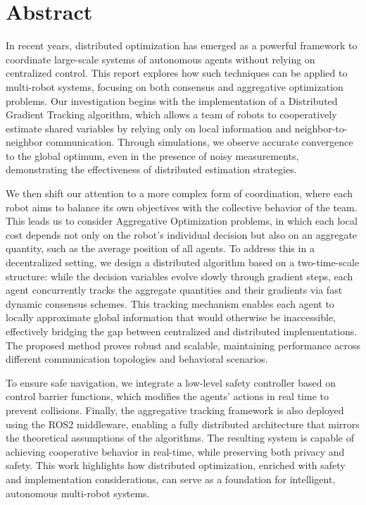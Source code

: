 \thispagestyle{empty}

\chapter*{Abstract}
In recent years, distributed optimization has emerged as a powerful framework to coordinate large-scale systems of autonomous agents without relying on centralized control. This report explores how such techniques can be applied to multi-robot systems, focusing on both consensus and aggregative optimization problems. Our investigation begins with the implementation of a Distributed Gradient Tracking algorithm, which allows a team of robots to cooperatively estimate shared variables by relying only on local information and neighbor-to-neighbor communication. Through simulations, we observe accurate convergence to the global optimum, even in the presence of noisy measurements, demonstrating the effectiveness of distributed estimation strategies. 

\bigskip

We then shift our attention to a more complex form of coordination, where each robot aims to balance its own objectives with the collective behavior of the team. This leads us to consider Aggregative Optimization problems, in which each local cost depends not only on the robot's individual decision but also on an aggregate quantity, such as the average position of all agents. To address this in a decentralized setting, we design a distributed algorithm based on a two-time-scale structure: while the decision variables evolve slowly through gradient steps, each agent concurrently tracks the aggregate quantities and their gradients via fast dynamic consensus schemes. This tracking mechanism enables each agent to locally approximate global information that would otherwise be inaccessible, effectively bridging the gap between centralized and distributed implementations. The proposed method proves robust and scalable, maintaining performance across different communication topologies and behavioral scenarios.

\bigskip

To ensure safe navigation, we integrate a low-level safety controller based on control barrier functions, which modifies the agents' actions in real time to prevent collisions. Finally, the aggregative tracking framework is also deployed using the ROS2 middleware, enabling a fully distributed architecture that mirrors the theoretical assumptions of the algorithms. The resulting system is capable of achieving cooperative behavior in real-time, while preserving both privacy and safety. This work highlights how distributed optimization, enriched with safety and implementation considerations, can serve as a foundation for intelligent, autonomous multi-robot systems.

